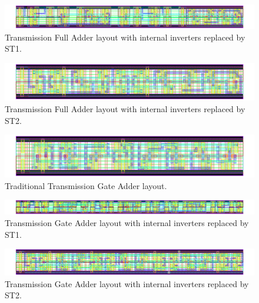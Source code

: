 \documentclass[pgmicro,mestrado,english]{iiufrgs}
\begin{document}
\newpage
\begin{figure}[]
\centering
\includegraphics[width=1.5\textwidth, angle =90]{TFAST1.png}
\caption{Transmission Full Adder layout with internal inverters replaced by ST1.}
\label{fig:TFAST1}
\end{figure}

\newpage
\begin{figure}[]
\centering
\includegraphics[width=1.5\textwidth, angle =90]{TFAST2.png}
\caption{Transmission Full Adder layout with internal inverters replaced by ST2.}
\label{fig:TFAST2}
\end{figure}






\newpage


\begin{figure}[]
\centering
\includegraphics[width=1.5\textwidth, angle =90]{TGA.png}
\caption{Traditional Transmission Gate Adder layout.}
\label{fig:TGA}
\end{figure}

\newpage
\begin{figure}[]
\centering
\includegraphics[width=1.5\textwidth, angle =90]{TGAST1.png}
\caption{Transmission Gate Adder layout with internal inverters replaced by ST1.}
\label{fig:TGAST1}
\end{figure}

\newpage
\begin{figure}[]
\centering
\includegraphics[width=1.5\textwidth, angle =90]{TGAST2.png}
\caption{Transmission Gate Adder layout with internal inverters replaced by ST2.}
\label{fig:TGAST2}
\end{figure}
\end{document}
